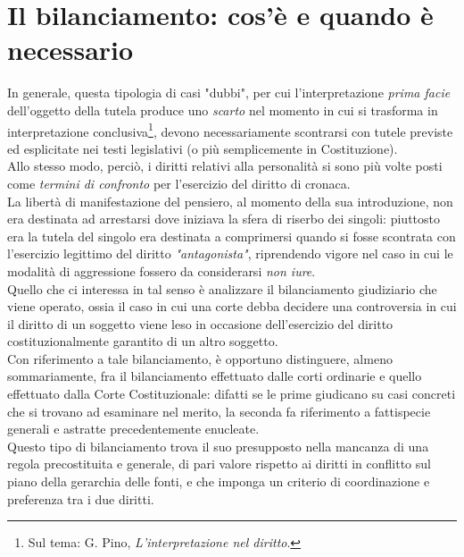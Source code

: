 \section{Il bilanciamento: cos'è e quando è necessario}
In generale, questa tipologia di casi "dubbi", per cui l'interpretazione \textit{prima facie} dell'oggetto della tutela produce uno \textit{scarto} nel momento in cui si trasforma in interpretazione conclusiva\footnote{Sul tema: G. Pino, \textit{L'interpretazione nel diritto}.}, devono necessariamente scontrarsi con tutele previste ed esplicitate nei testi legislativi (o più semplicemente in Costituzione).
\\Allo stesso modo, perciò, i diritti relativi alla personalità si sono più volte posti come \textit{termini di confronto} per l'esercizio del diritto di cronaca.
\\La libertà di manifestazione del pensiero, al momento della sua introduzione, non era destinata ad arrestarsi dove iniziava la sfera di riserbo dei singoli: piuttosto era la tutela del singolo era destinata a comprimersi quando si fosse scontrata con l'esercizio legittimo del diritto \textit{"antagonista"}, riprendendo vigore nel caso in cui le modalità di aggressione fossero da considerarsi \textit{non iure}.
\\Quello che ci interessa in tal senso è analizzare il bilanciamento giudiziario che viene operato, ossia il caso in cui una corte debba decidere una controversia in cui il diritto di un soggetto viene leso in occasione dell'esercizio del diritto costituzionalmente garantito di un altro soggetto.
\\Con riferimento a tale bilanciamento, è opportuno distinguere, almeno sommariamente, fra il bilanciamento effettuato dalle corti ordinarie e quello effettuato dalla Corte Costituzionale: difatti se le prime giudicano su casi concreti che si trovano ad esaminare nel merito, la seconda fa riferimento a fattispecie generali e astratte precedentemente enucleate. 
\\Questo tipo di bilanciamento trova il suo presupposto nella mancanza di una regola precostituita e generale, di pari valore rispetto ai diritti in conflitto sul piano della gerarchia delle fonti, e che imponga un criterio di coordinazione e preferenza tra i due diritti.


